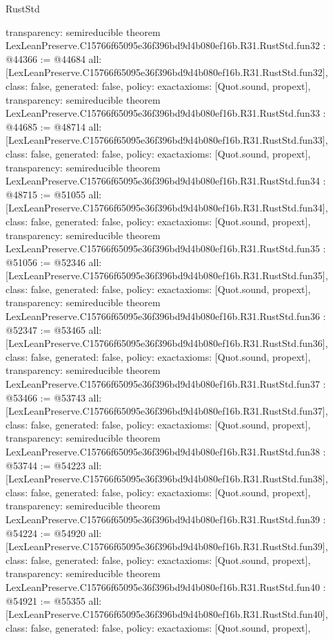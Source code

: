 \begin{lexlean}{RustStd}
\begin{coremodule}
{  transparency: semireducible
}
theorem LexLeanPreserve.C15766f65095e36f396bd9d4b080ef16b.R31.RustStd.fun32 : @44366 := @44684 {
  all: [LexLeanPreserve.C15766f65095e36f396bd9d4b080ef16b.R31.RustStd.fun32],
  class: false,
  generated: false,
  policy: exact{axioms: [Quot.sound, propext]},
  transparency: semireducible
}
theorem LexLeanPreserve.C15766f65095e36f396bd9d4b080ef16b.R31.RustStd.fun33 : @44685 := @48714 {
  all: [LexLeanPreserve.C15766f65095e36f396bd9d4b080ef16b.R31.RustStd.fun33],
  class: false,
  generated: false,
  policy: exact{axioms: [Quot.sound, propext]},
  transparency: semireducible
}
theorem LexLeanPreserve.C15766f65095e36f396bd9d4b080ef16b.R31.RustStd.fun34 : @48715 := @51055 {
  all: [LexLeanPreserve.C15766f65095e36f396bd9d4b080ef16b.R31.RustStd.fun34],
  class: false,
  generated: false,
  policy: exact{axioms: [Quot.sound, propext]},
  transparency: semireducible
}
theorem LexLeanPreserve.C15766f65095e36f396bd9d4b080ef16b.R31.RustStd.fun35 : @51056 := @52346 {
  all: [LexLeanPreserve.C15766f65095e36f396bd9d4b080ef16b.R31.RustStd.fun35],
  class: false,
  generated: false,
  policy: exact{axioms: [Quot.sound, propext]},
  transparency: semireducible
}
theorem LexLeanPreserve.C15766f65095e36f396bd9d4b080ef16b.R31.RustStd.fun36 : @52347 := @53465 {
  all: [LexLeanPreserve.C15766f65095e36f396bd9d4b080ef16b.R31.RustStd.fun36],
  class: false,
  generated: false,
  policy: exact{axioms: [Quot.sound, propext]},
  transparency: semireducible
}
theorem LexLeanPreserve.C15766f65095e36f396bd9d4b080ef16b.R31.RustStd.fun37 : @53466 := @53743 {
  all: [LexLeanPreserve.C15766f65095e36f396bd9d4b080ef16b.R31.RustStd.fun37],
  class: false,
  generated: false,
  policy: exact{axioms: [Quot.sound, propext]},
  transparency: semireducible
}
theorem LexLeanPreserve.C15766f65095e36f396bd9d4b080ef16b.R31.RustStd.fun38 : @53744 := @54223 {
  all: [LexLeanPreserve.C15766f65095e36f396bd9d4b080ef16b.R31.RustStd.fun38],
  class: false,
  generated: false,
  policy: exact{axioms: [Quot.sound, propext]},
  transparency: semireducible
}
theorem LexLeanPreserve.C15766f65095e36f396bd9d4b080ef16b.R31.RustStd.fun39 : @54224 := @54920 {
  all: [LexLeanPreserve.C15766f65095e36f396bd9d4b080ef16b.R31.RustStd.fun39],
  class: false,
  generated: false,
  policy: exact{axioms: [Quot.sound, propext]},
  transparency: semireducible
}
theorem LexLeanPreserve.C15766f65095e36f396bd9d4b080ef16b.R31.RustStd.fun40 : @54921 := @55355 {
  all: [LexLeanPreserve.C15766f65095e36f396bd9d4b080ef16b.R31.RustStd.fun40],
  class: false,
  generated: false,
  policy: exact{axioms: [Quot.sound, propext]},
}
\end{coremodule}
\end{lexlean}
